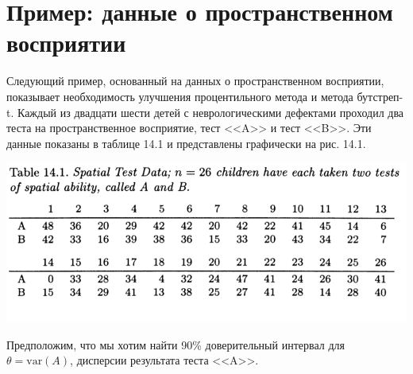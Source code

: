 \section{Пример: данные о пространственном восприятии}

Следующий пример, основанный на данных о пространственном восприятии, показывает необходимость улучшения процентильного метода и метода бутстреп-t. Каждый из двадцати шести детей с неврологическими дефектами проходил два теста на пространственное восприятие, тест <<A>> и тест <<B>>. Эти данные показаны в таблице 14.1 и представлены графически на рис. 14.1.

\noindent
\begin{center}
\includegraphics[width=0.9\linewidth]{14/t141.png}
\end{center}
\setcounter{table}{1}

Предположим, что мы хотим найти 90\% доверительный интервал для $\theta = \text{var} (A)$, дисперсии результата теста <<A>>.


